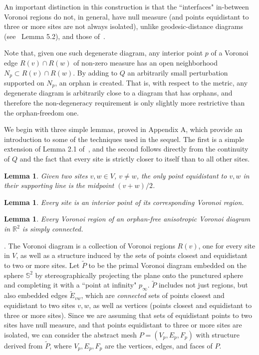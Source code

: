 \documentclass[11pt]{article}
\newtheorem{lemma}[theorem]{Lemma}
\begin{document}
An important distinction in this construction is that  the ``interfaces" 
in-between Voronoi regions do not, in general, have null measure 
(and points equidistant to three or more sites are not always isolated), 
unlike geodesic-distance diagrams~\cite{LL2000} 
(see~\cite{enets} Lemma 5.2), and those of~\cite{LS}. 

Note that, given one such degenerate diagram, any interior point $p$ of a Voronoi edge
$R(v)\cap R(w)$
of non-zero measure 
has an open neighborhood $N_p\subset R(v)\cap R(w)$. 
By adding to $Q$ an arbitrarily
small perturbation supported on $N_p$, an orphan is created.
That is, with respect to the metric, any degenerate diagram is
arbitrarily close to a diagram that has orphans, and therefore the
non-degeneracy requirement is only slightly more restrictive than the
orphan-freedom one. 



We begin with three simple lemmas, proved in Appendix A, which provide an introduction to some of the techniques used in the sequel. 
The first is a simple extension of Lemma 2.1 of~\cite{DW}, and the second follows directly from the continuity of $Q$ and the fact that every site is {strictly} closer to itself than to all other sites. 

\begin{lemma}\label{lem:midpoint}
	Given two sites $v,w\in V$, $v\ne w$, the only point equidistant to $v,w$ in their supporting
line is the midpoint $(v+w)/2$. 
\end{lemma}


\begin{lemma}\label{lem:interior}
    Every site is an interior point of its corresponding Voronoi region. 
\end{lemma}


\begin{lemma}\label{lem:sc}
Every Voronoi region of an orphan-free anisotropic Voronoi diagram in 
$\mathbb{R}^2$ is simply connected. 
\end{lemma}



. 
The Voronoi diagram is a collection of Voronoi regions $R(v)$, one for every site in $V$, as well as a structure 
induced by the sets of points closest and equidistant to two or more sites. 
Let $\tilde{P}$ to be the primal Voronoi diagram embedded on the sphere
$\mathbb{S}^2$ by stereographically projecting the plane onto the 
punctured sphere and
completing it with a ``point at infinity" $p_\infty$.
$\tilde{P}$ includes not just regions, but also embedded edges $\tilde{E}_{v w}$,
which are \emph{connected} sets of points closest and equidistant to two sites $v,w$, as well
as vertices (points closest and equidistant to three or more sites). 
Since we are assuming that sets of  equidistant points to two sites have
null measure, and that
points equidistant to three or more sites are isolated, 
we can consider the abstract mesh  $P=(V_p,E_p,F_p)$ with structure
derived from 
$\tilde{P}$, where $V_p,E_p,F_p$ are the vertices, edges, and faces of $P$. 
\end{document}
